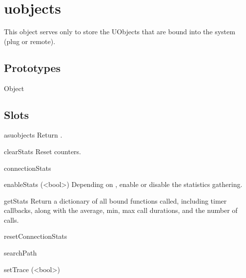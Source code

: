 
\section{uobjects}

This object serves only to store the UObjects that are bound into the system
(plug or remote).

\subsection{Prototypes}
\begin{refObjects}
\item[Object]
\end{refObjects}

\subsection{Slots}

\begin{urbiscriptapi}
\item[asuobjects]%
  Return \this.


\item[clearStats]%
  Reset counters.


\item[connectionStats]%


\item[enableStats](<bool>)%
  Depending on , enable or disable the statistics gathering.


\item[getStats]%
  Return a dictionary of all bound \Cxx functions called, including timer
  callbacks, along with the average, min, max call durations, and the number
  of calls.


\item[resetConnectionStats]%


\item[searchPath]%


\item[setTrace](<bool>)%
\end{urbiscriptapi}

